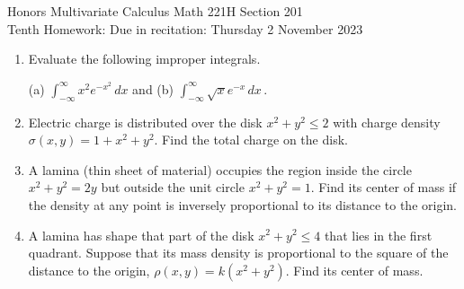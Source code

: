 \documentclass[12pt]{article}
\begin{document}
\LARGE 
\noindent
{\color{Maroon}Honors Multivariate Calculus \hfill Math 221H Section 201}\vspace{2pt}\\
\large
Tenth Homework:\hfill 
Due in recitation: Thursday 2 November 2023\vspace{2pt}

\normalsize
    \vspace{2pt}

\begin{enumerate}



\item Evaluate the following improper integrals.

  (a) ${\displaystyle \int_{-\infty}^\infty x^2 e^{-x^2}\, dx}$
  \qquad and \qquad
  (b) ${\displaystyle \int_{-\infty}^\infty \sqrt{x} e^{-x}\, dx}$\,.
  
\vspace{-2pt}
   
\item Electric charge is distributed over the disk $x^2+y^2\leq 2$ with charge density $\sigma(x,y)=1+x^2+y^2$.
  Find the total charge on the disk.
\vspace{-2pt}
   


\item A lamina (thin sheet of material) occupies the region inside the circle $x^2+y^2=2y$ but outside the unit circle
  $x^2+y^2=1$.
  Find its center of mass if the density at any point is inversely proportional to its distance to the origin.
\vspace{-2pt}
   



\item A lamina  has shape that part of the disk $x^2+y^2\leq 4$ that lies in the first quadrant.
  Suppose that its mass density is proportional to the square of the distance to the origin, $\rho(x,y)=k(x^2+y^2)$.
  Find its center of mass.
\vspace{-2pt}
   


\end{enumerate}
\end{document}
